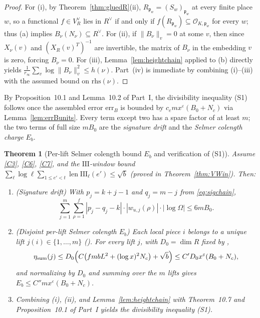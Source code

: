\documentclass[11pt]{amsart}
\newcommand{\eps}{\varepsilon}
\newcommand{\Oc}{\mathcal{O}}
\newcommand{\fp}{\mathfrak{p}}
\newcommand{\Sha}{\mathrm{III}}
\DeclareMathOperator{\len}{len}
\theoremstyle{plain}
\newtheorem{theorem}{Theorem}[section]
\theoremstyle{definition}
\numberwithin{equation}{section}
\begin{document}
\begin{proof}
For (i), by Theorem~\ref{thm:gluedR}(ii), $R_{\fp_w}=(S_w)_{\fp_w}$ at every finite place $w$, so
a functional $f\in V_R^\vee$ lies in $R^\vee$ if and only if $f(R_{\fp_w})\subseteq\Oc_{K,\fp_w}$
for every $w$; thus (a) implies $B_\nu(N_\nu)\subseteq R^\vee$. For (ii), if $\|B_\nu\|_v=0$ at
some $v$, then since $X_\nu(v)$ and $(X_R(v)^T)^{-1}$ are invertible, the matrix of $B_\nu$ in
the embedding $v$ is zero, forcing $B_\nu=0$. For (iii), Lemma~\ref{lem:heightchain} applied to
(b) directly yields $\frac{1}{r_\infty}\sum_v\log\|B_\nu\|_v^2\le h(\nu)$. Part~(iv) is
immediate by combining (i)--(iii) with the assumed bound on $\mathrm{rhs}(\nu)$.
\end{proof}

By Proposition~10.1 and Lemma~10.2 of Part~I, the divisibility inequality (S1) follows once the
assembled error $\mathrm{err}_B$ is bounded by $c_e m x^\eps(B_0+N_c)$ via
Lemma~\ref{lem:errBunits}. Every term except two has a spare factor of at least $m$; the two terms
of full size $m B_0$ are the \emph{signature drift} and the \emph{Selmer colength charge} $E_b$.

\begin{theorem}[Per-lift Selmer colength bound $E_b$ and verification of (S1)]\label{thm:S1}
Assume \ref{C3}, \ref{C6}, \ref{C7}, and the $\Sha$-window bound
$\sum_\ell\log\ell\sum_{1\le e'<t}\len\Sha_\ell(e')\le\sqrt{b}$ (proved in Theorem~\ref{thm:VWin}).
Then:
\begin{enumerate}[label=(\roman*)]
\item \textup{(Signature drift)} With $p_j=k+j-1$ and $q_j=m-j$ from \eqref{eq:sigchain},
  \[
  \sum_{j=1}^m\sum_{\rho=1}^f |p_j-q_j-k|\cdot |w_{u,j}(\rho)|\cdot |\log\Omega|\le 6mB_0.
  \]
\item \textup{(Disjoint per-lift Selmer colength $E_b$)} Each local piece $i$ belongs to a unique
  lift $j(i)\in\{1,\dots,m\}$ (). For every lift $j$, with $D_0=\dim R$ fixed
  by ,
  \[
  \eta_{\mathrm{sum}}(j)\le D_0\Bigl(C\bigl(fmbL^2+(\log x)^2 N_c\bigr)+\sqrt{b}\Bigr)
  \le C' D_0 x^\eps(B_0+N_c),
  \]
  and normalizing by $D_0$ and summing over the $m$ lifts gives $E_b\le C'' m x^\eps(B_0+N_c)$.
\item Combining (i), (ii), and Lemma~\ref{lem:heightchain} with Theorem~10.7 and Proposition~10.1
  of Part~I yields the divisibility inequality \textup{(S1)}.
\end{enumerate}
\end{theorem}
\end{document}
